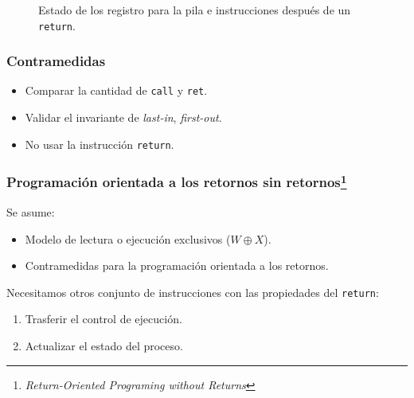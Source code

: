 \documentclass{beamer}
\newcommand { \return } {\texttt{return}\xspace}
\newcommand { \vs } {\vspace{0.5cm}}
\begin{document}
\begin{frame}
{\begin{figure}[h]
            \caption{Estado de los registro para la pila e instrucciones después de un \return.}
        \end{figure}
    }
\end{frame}

\begin{frame}
    \frametitle{Contramedidas}
    \begin{itemize}
        \item Comparar la cantidad de \texttt{call} y \texttt{ret}. 
        \item Validar el invariante de \textit{last-in}, \textit{first-out}.
        \item No usar la instrucción \return.
    \end{itemize}
\end{frame}

\begin{frame}
    \frametitle{Programación orientada a los retornos sin retornos\footnote{\textit{Return-Oriented Programing without Returns}}}
    Se asume:

    \begin{itemize}
        \item Modelo de lectura o ejecución exclusivos ($W \oplus X$).
        \item Contramedidas para la programación orientada a los retornos.
    \end{itemize}
    \vs
    Necesitamos otros conjunto de instrucciones con las propiedades del \return:
    \begin{enumerate}
        \item Trasferir el control de ejecución.
        \item Actualizar el estado del proceso.
    \end{enumerate}
\end{frame}
\end{document}
